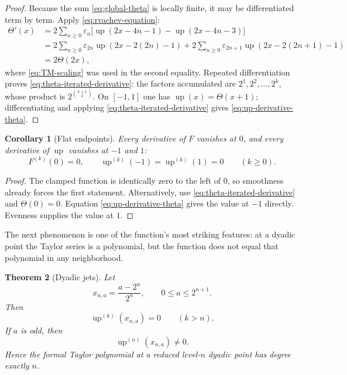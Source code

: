 \documentclass[11pt,oneside]{article}
\newtheorem{theorem}{Theorem}[section]
\newtheorem{corollary}[theorem]{Corollary}
\theoremstyle{definition}
\theoremstyle{remark}
\newcommand{\upf}{\operatorname{up}}
\newcommand{\epsTM}{\varepsilon}
\newcommand{\Thetaf}{\Theta}
\begin{document}
\begin{proof}
Because the sum \eqref{eq:global-theta} is locally finite, it may be differentiated
term by term.  Apply \eqref{eq:rvachev-equation}:
\begin{align*}
 \Thetaf'(x)
 &=2\sum_{n\ge0}\epsTM_n
   \bigl[\upf(2x-4n-1)-\upf(2x-4n-3)\bigr]\\
 &=2\sum_{n\ge0}\epsTM_{2n}\upf(2x-2(2n)-1)
   +2\sum_{n\ge0}\epsTM_{2n+1}\upf(2x-2(2n+1)-1)\\
 &=2\Thetaf(2x),
\end{align*}
where \eqref{eq:TM-scaling} was used in the second equality.  Repeated
differentiation proves \eqref{eq:theta-iterated-derivative}: the factors accumulated
are $2^1,2^2,\ldots,2^k$, whose product is $2^{\binom{k+1}{2}}$.
On $[-1,1]$ one has $\upf(x)=\Thetaf(x+1)$; differentiating and applying
\eqref{eq:theta-iterated-derivative} gives
\eqref{eq:up-derivative-theta}.
\end{proof}

\begin{corollary}[Flat endpoints]\label{cor:flat-endpoints}
Every derivative of $F$ vanishes at $0$, and every derivative of $\upf$ vanishes at
$-1$ and $1$:
\begin{equation}\label{eq:flatness}
  F^{(k)}(0)=0,
  \qquad
  \upf^{(k)}(-1)=\upf^{(k)}(1)=0
  \qquad(k\ge0).
\end{equation}
\end{corollary}

\begin{proof}
The clamped function is identically zero to the left of $0$, so smoothness already
forces the first statement.  Alternatively, use
\eqref{eq:theta-iterated-derivative} and $\Thetaf(0)=0$.  Equation
\eqref{eq:up-derivative-theta} gives the value at $-1$ directly.  Evenness supplies
the value at $1$.
\end{proof}

The next phenomenon is one of the function's most striking features: at a dyadic
point the Taylor series is a polynomial, but the function does not equal that
polynomial in any neighborhood.

\begin{theorem}[Dyadic jets]\label{thm:dyadic-jets}
Let
\begin{equation}\label{eq:centered-dyadic}
  x_{n,a}=\frac{a-2^n}{2^n},
  \qquad 0\le a\le2^{n+1}.
\end{equation}
Then
\begin{equation}\label{eq:dyadic-high-derivatives-zero}
  \upf^{(k)}(x_{n,a})=0\qquad(k>n).
\end{equation}
If $a$ is odd, then
\begin{equation}\label{eq:dyadic-top-derivative-nonzero}
  \upf^{(n)}(x_{n,a})\ne0.
\end{equation}
Hence the formal Taylor polynomial at a reduced level-$n$ dyadic point has degree
exactly $n$.
\end{theorem}
\end{document}

